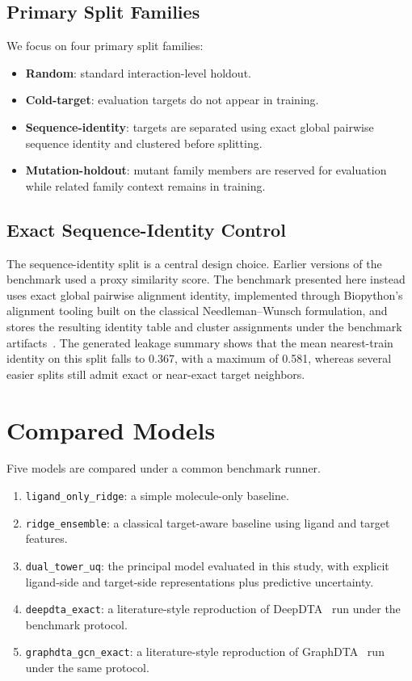 \documentclass[11pt]{article}
\begin{document}
\subsection{Primary Split Families}

We focus on four primary split families:

\begin{itemize}[leftmargin=1.5em]
  \item \textbf{Random}: standard interaction-level holdout.
  \item \textbf{Cold-target}: evaluation targets do not appear in training.
  \item \textbf{Sequence-identity}: targets are separated using exact global
  pairwise sequence identity and clustered before splitting.
  \item \textbf{Mutation-holdout}: mutant family members are reserved for
  evaluation while related family context remains in training.
\end{itemize}

\subsection{Exact Sequence-Identity Control}

The sequence-identity split is a central design choice. Earlier versions of the
benchmark used a proxy similarity score. The benchmark presented here instead uses
exact global pairwise alignment identity, implemented through Biopython's
alignment tooling built on the classical Needleman--Wunsch formulation, and
stores the resulting identity table and cluster assignments under the benchmark
artifacts~\cite{needleman_wunsch,biopython}. The generated leakage summary
shows that the mean nearest-train identity on this split falls to 0.367, with
a maximum of 0.581, whereas several easier splits still admit exact or
near-exact target neighbors.

\section{Compared Models}

Five models are compared under a common benchmark runner.

\begin{enumerate}[leftmargin=1.5em]
  \item \texttt{ligand\_only\_ridge}: a simple molecule-only baseline.
  \item \texttt{ridge\_ensemble}: a classical target-aware baseline using
  ligand and target features.
  \item \texttt{dual\_tower\_uq}: the principal model evaluated in this study,
  with explicit
  ligand-side and target-side representations plus predictive uncertainty.
  \item \texttt{deepdta\_exact}: a literature-style reproduction of
  DeepDTA~\cite{deepdta} run under the benchmark protocol.
  \item \texttt{graphdta\_gcn\_exact}: a literature-style reproduction of
  GraphDTA~\cite{graphdta} run under the same protocol.
\end{enumerate}
\end{document}
